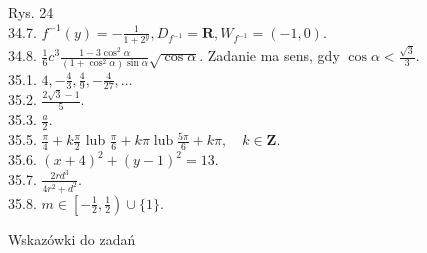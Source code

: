 \documentclass[10pt]{article}
\begin{document}
Rys. 24\\
34.7. $f^{-1}(y)=-\frac{1}{1+2^{y}}, D_{f^{-1}}=\mathbf{R}, W_{f^{-1}}=(-1,0)$.\\
34.8. $\frac{1}{6} c^{3} \frac{1-3 \cos ^{2} \alpha}{\left(1+\cos ^{2} \alpha\right) \sin \alpha} \sqrt{\cos \alpha}$. Zadanie ma sens, gdy $\cos \alpha<\frac{\sqrt{3}}{3}$.\\
35.1. $4,-\frac{4}{3}, \frac{4}{9},-\frac{4}{27}, \ldots$\\
35.2. $\frac{2 \sqrt{3}-1}{5}$.\\
35.3. $\frac{a}{2}$.\\
35.5. $\frac{\pi}{4}+k \frac{\pi}{2}$ lub $\frac{\pi}{6}+k \pi \operatorname{lub} \frac{5 \pi}{6}+k \pi, \quad k \in \mathbf{Z}$.\\
35.6. $(x+4)^{2}+(y-1)^{2}=13$.\\
35.7. $\frac{2 r d^{3}}{4 r^{2}+d^{2}}$.\\
35.8. $m \in\left[-\frac{1}{2}, \frac{1}{2}\right) \cup\{1\}$.

Wskazówki do zadań
\end{document}
